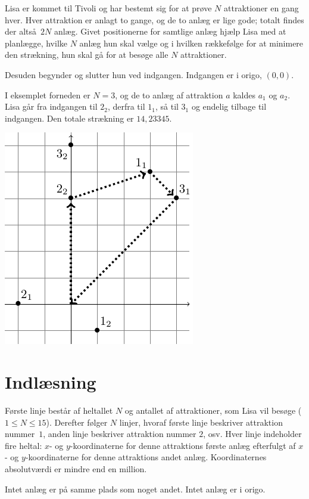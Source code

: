
Lisa er kommet til Tivoli og har bestemt sig for at prøve $N$ attraktioner en gang hver.
Hver attraktion er anlagt to gange, og de to anlæg er lige gode; totalt findes der altså $2N$ anlæg.
Givet positionerne for samtlige anlæg hjælp Lisa med at planlægge, hvilke $N$ anlæg hun skal vælge og i hvilken rækkefølge for at minimere den strækning, hun skal gå for at besøge alle $N$ attraktioner.

Desuden begynder og slutter hun ved indgangen.
Indgangen er i origo, $(0,0)$.

I eksemplet forneden er $N=3$, og de to anlæg af attraktion $a$ kaldes $a_1$ og $a_2$.
Lisa går fra indgangen til $2_2$, derfra til $1_1$, så til $3_1$ og endelig tilbage til indgangen.
Den totale strækning er $14{,}23345$.

\bigskip
\includegraphics{img/tivoli-sample-img.pdf}

\section*{Indlæsning}
Første linje består af heltallet $N$ og antallet af attraktioner, som Lisa vil besøge ($1 \le N \le 15$).
Derefter følger $N$ linjer, hvoraf første linje beskriver attraktion nummer~$1$, anden linje beskriver attraktion nummer $2$, osv.
Hver linje indeholder fire heltal: $x$- og $y$-koordinaterne for denne attraktions første anlæg efterfulgt af $x$- og $y$-koordinaterne for denne attraktions andet anlæg.
Koordinaternes absolutværdi er mindre end en million.

Intet anlæg er på samme plads som noget andet.
Intet anlæg er i origo.

